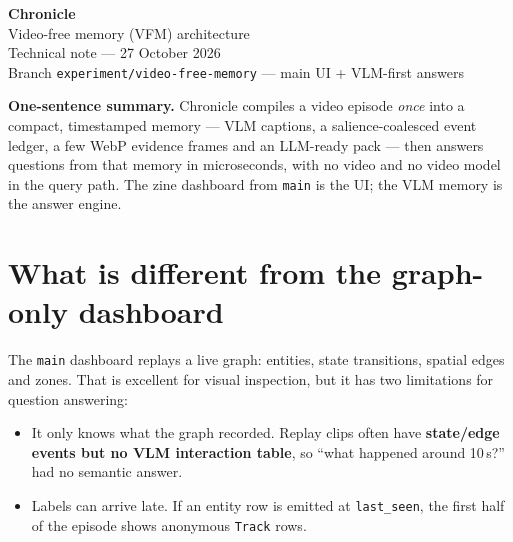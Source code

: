 \documentclass[10pt,a4paper]{article}
\newcommand{\code}[1]{\texttt{\small #1}}
\newcommand{\panel}[1]{%
  \noindent\colorbox{panel}{%
    \begin{minipage}{\dimexpr\linewidth-2\fboxsep\relax}
    \vspace{2pt}#1\vspace{2pt}
    \end{minipage}}%
}
\begin{document}
\begin{center}
{\LARGE\bfseries Chronicle}\\[2pt]
{\Large Video-free memory (VFM) architecture}\\[6pt]
{\color{muted}\small Technical note --- 27 October 2026}\\[2pt]
{\color{muted}\small Branch \code{experiment/video-free-memory} --- main UI + VLM-first answers}
\end{center}

\begin{center}
\end{center}

\vspace{-2pt}
\panel{
\textbf{One-sentence summary.} Chronicle compiles a video episode \emph{once} into a compact,
timestamped memory --- VLM captions, a salience-coalesced event ledger, a few WebP evidence
frames and an LLM-ready pack --- then answers questions from that memory in microseconds, with no
video and no video model in the query path. The zine dashboard from \code{main} is the UI; the VLM
memory is the answer engine.
}

\section{What is different from the graph-only dashboard}

The \code{main} dashboard replays a live graph: entities, state transitions, spatial edges and
zones. That is excellent for visual inspection, but it has two limitations for question answering:

\begin{itemize}[leftmargin=1.25em,itemsep=1pt]
  \item It only knows what the graph recorded. Replay clips often have \textbf{state/edge events
        but no VLM interaction table}, so ``what happened around 10\,s?'' had no semantic answer.
  \item Labels can arrive late. If an entity row is emitted at \code{last\_seen}, the first half of
        the episode shows anonymous \code{Track} rows.
\end{itemize}
\end{document}
